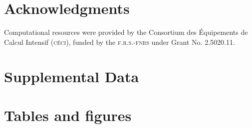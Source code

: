 \documentclass[utf8]{frontiersSCNS}
\begin{document}
\section*{Acknowledgments}
Computational resources were provided by the Consortium des \'Equipements de Calcul Intensif (\textsc{c\'eci}), funded by the \textsc{f.r.s.-fnrs} under Grant No. 2.5020.11.

\section*{Supplemental Data}

 



\section*{Tables and figures}
\end{document}
